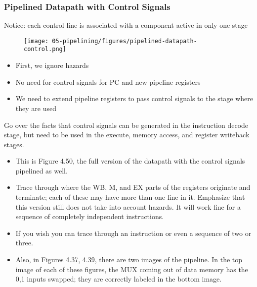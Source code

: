 \newpage
\begin{frame}\frametitle{Pipelined Datapath with Control Signals}
Notice: each control line is associated with a component active in only one
stage
\begin{figure}[H]
\centering
	{\texttt{[image: 05-pipelining/figures/pipelined-datapath-control.png]}}
\end{figure}

\end{frame}

\begin{frame}[fragile]
\begin{itemize}
\item First, we ignore hazards
\item No need for control signals for PC and new pipeline registers
\item We need to extend pipeline registers to pass control signals 
to the stage where they are used

\end{itemize}
\BNotes\ifnum{}
Go over the facts that control signals can be generated in the
instruction decode stage, but need to be used in the execute, memory
access, and register writeback stages.
\fi\ENotes
\end{frame}

\begin{frame}[fragile]
\BNotes\ifnum{}
\begin{itemize}
\item This is Figure 4.50, the full version of the datapath with the 
	control signals pipelined as well. 
\item Trace through where the WB, M, and 
	EX parts of the registers originate and terminate; each of these may 
	have more than one line in it. Emphasize that this version still does 
	not take into account hazards. It will work fine for a sequence of 
	completely independent instructions. 
\item If you wish you can trace 
	through an instruction or even a sequence 
	of two or three.
\item Also, in Figures 4.37, 4.39, there are two
	images of the pipeline.  In the top image of each of these figures,
	the MUX coming out of data memory has the 0,1 inputs swapped; they
	are correctly labeled in the bottom image.
\end{itemize}
\fi\ENotes
\end{frame}

